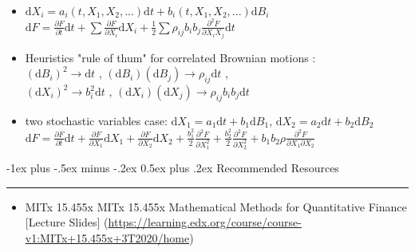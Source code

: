 \documentclass[10pt,landscape,a4paper]{article}
\makeatletter
\renewcommand{\section}{\@startsection{section}{1}{0mm}%
                                {-1ex plus -.5ex minus -.2ex}%
                                {0.5ex plus .2ex}%
                                {\normalfont\large\bfseries}}
\makeatother
\begin{document}
\begin{multicols*}{3}
\begin{description}[topsep=0pt]
	\item[It\^{o}'s lemma: multiple stochastic variables] ~
	\begin{itemize}[topsep=0pt]
		\item  $ \text{d}X_i = a_i(t,X_1,X_2,...) \text{d}t+ b_i(t,X_1,X_2,...)\text{d} B_i $ \\
		 $\text{d} F = \frac{\partial F}{\partial t} \text{d}t + \sum \frac{\partial F}{\partial X_i} \text{d}X_i + \frac{1}{2} \sum \rho_{ij} b_i b_j \frac{\partial ^2 F}{\partial X_i X_j} \text{d}t$ 
		 \item Heuristics "rule of thum" for correlated Brownian motions : \\
		    $ (\text{d}B_i)^2 \rightarrow \text{d}t $ , 
		    $ (\text{d}B_i)(\text{d}B_j) \rightarrow \rho_{ij} \text{d}t$ ,\\ 
		    $ (\text{d}X_i )^2 \rightarrow b^2_i \text{d}t $ ,
		    $ (\text{d}X_i)(\text{d}X_j) \rightarrow \rho_{ij} b_i b_j \text{d} t $ 
		 \item two stochastic variables case:  $\text{d}X_1 = a_1 \text{d}t + b_1 \text{d}B_1 $, $\text{d}X_2 = a_2 \text{d}t + b_2 \text{d}B_2 $ \\
		 $\text{d}F =  \frac{\partial F}{\partial t} \text{d}t + \frac{\partial F}{\partial X_1} \text{d}X_1+ \frac{\partial F}{\partial X_2} \text{d}X_2 + \frac{b_1^2}{2}  \frac{\partial^2 F}{\partial X_1^2} + \frac{b_2^2}{2}  \frac{\partial^2 F}{\partial X_2^2} + b_1 b_2 \rho \frac{\partial^2 F}{\partial X_1 \partial X_2}  $
		 
	\end{itemize}
\end{description}

\newpage

\section{Recommended Resources} \smallskip \hrule height 1pt \smallskip

\bigskip

\begin{itemize}
\item MITx 15.455x 
MITx 15.455x
Mathematical Methods for Quantitative Finance [Lecture Slides] (\url{https://learning.edx.org/course/course-v1:MITx+15.455x+3T2020/home})


\end{itemize}
\end{multicols*}
\end{document}
